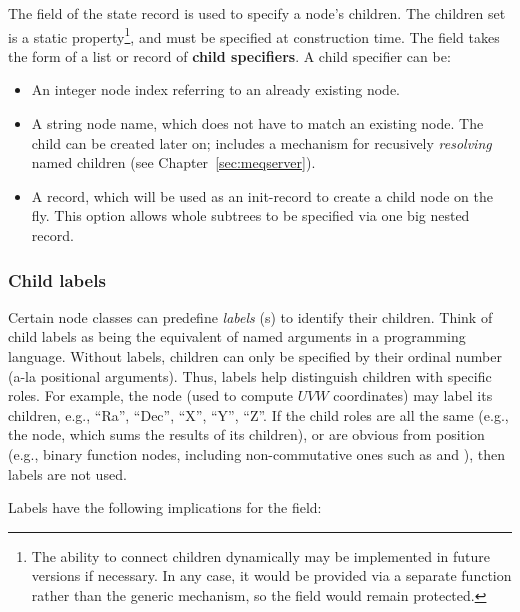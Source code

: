   The  field of the state record is used to specify a node's
  children. The children set is a static property\footnote{The ability to
  connect children dynamically may be implemented in future versions if
  necessary. In any case, it would be provided via a separate function rather
  than the generic  mechanism, so the  field would
  remain protected.}, and must be specified at construction time. The
   field takes the form of a list or record of {\bf child
  specifiers}. A child specifier can be:

  \begin{itemize}
  
  \item An integer node index referring to an already existing node.
  
  \item A string node name, which does not have to match an existing node. The
    child can be created later on;  includes a mechanism  for
    recusively {\em resolving} named children (see
    Chapter~\ref{sec:meqserver}).

  \item A record, which will be used as an init-record to create a child node on
    the fly. This option allows whole subtrees to be specified via one big
    nested record.
  
  \end{itemize}
  
  \subsubsection{Child labels}
  
  Certain node classes can predefine {\em labels} (s) to identify their
  children. Think of child labels as being the equivalent of named arguments in
  a programming language. Without labels, children can only be specified by
  their ordinal number (a-la positional arguments). Thus, labels help
  distinguish children with specific roles. For example, the  node
  (used to compute $UVW$ coordinates) may label its children, e.g., ``Ra'',
  ``Dec'', ``X'', ``Y'', ``Z''. If the child roles are all the same (e.g.,
  the  node, which sums the results of its children), or are obvious
  from position (e.g., binary function nodes, including non-commutative ones
  such as  and ), then labels are not used.
  
  Labels have the following implications for the  field:
  
